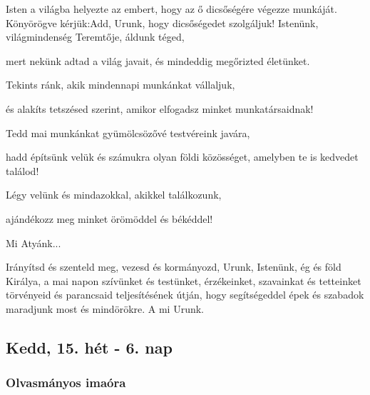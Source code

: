 \documentclass[twoside]{article}
\begin{document}



\begin{preces}{Isten a világba helyezte az embert, hogy az ő dicsőségére végezze munkáját. Könyörögve kérjük:}{Add, Urunk, hogy dicsőségedet szolgáljuk!}
  Istenünk, világmindenség Teremtője, áldunk téged,

  \reddash mert nekünk adtad a világ javait, és mindeddig megőrizted életünket.

  Tekints ránk, akik mindennapi munkánkat vállaljuk,

  \reddash és alakíts tetszésed szerint, amikor elfogadsz minket munkatársaidnak!

  Tedd mai munkánkat gyümölcsözővé testvéreink javára,

  \reddash hadd építsünk velük és számukra olyan földi közösséget, amelyben te is kedvedet találod!

  Légy velünk és mindazokkal, akikkel találkozunk,

  \reddash ajándékozz meg minket örömöddel és békéddel!
\end{preces}
Mi Atyánk...

Irányítsd és szenteld meg, vezesd és kormányozd, Urunk, Istenünk, ég és föld Királya, a mai napon szívünket és testünket, érzékeinket, szavainkat és tetteinket törvényeid és parancsaid teljesítésének útján, hogy segítségeddel épek és szabadok maradjunk most és mindörökre. A mi Urunk.


\subsection*{Kedd, 15. hét - 6. nap}


\subsubsection*{Olvasmányos imaóra}


\end{document}
